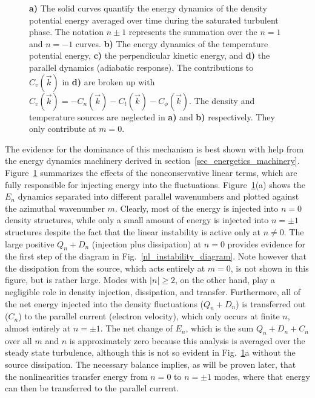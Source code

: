 \documentclass[showpacs,preprintnumbers,amsmath,amssymb,superscriptaddress]{revtex4}
\begin{document}
\begin{figure}
\hfil
\caption{\textbf{a)} The solid curves quantify the energy dynamics of the density potential energy averaged over time during the saturated turbulent phase. The notation $n \pm 1$ represents the
summation over the $n=1$ and $n=-1$ curves. \textbf{b)} The energy dynamics of the temperature potential energy, \textbf{c)} the perpendicular kinetic energy, and \textbf{d)} the parallel
dynamics (adiabatic response). The contributions to $C_v(\vec{k})$ in \textbf{d)} are broken up with $C_v(\vec{k}) = -C_n(\vec{k}) - C_t(\vec{k}) - C_\phi(\vec{k})$. 
The density and temperature sources are neglected in \textbf{a)} and \textbf{b)} respectively. They only contribute at $m=0$.}
\label{nc_dynamics_figures}
\end{figure}


The evidence for the dominance of this mechanism is best shown with
help from the energy dynamics machinery derived in section~\ref{sec_energetics_machinery}. Figure~\ref{nc_dynamics_figures} summarizes the effects of the nonconservative linear terms, which are
fully responsible for injecting energy into the fluctuations. Figure~\ref{nc_dynamics_figures}(a) shows the $E_n$ dynamics separated into different parallel wavenumbers and plotted
against the azimuthal wavenumber $m$. Clearly, most of the energy is injected into $n=0$ density structures, while only a small amount of energy is injected into
$n= \pm 1$ structures despite the fact that the linear instability is active only at $n \ne 0$. The large positive $Q_n + D_n$ (injection plus dissipation) at $n=0$ provides evidence for the first
step of the diagram in Fig.~\ref{nl_instability_diagram}. Note however that the dissipation from the source, which acts entirely at $m=0$, is not shown in this figure, but is rather large.
Modes with $|n| \ge 2$, on the other hand, play a negligible role in density injection, dissipation, and transfer. 
Furthermore, all of the net energy injected into the density fluctuations ($Q_n + D_n$) is transferred out ($C_n$) to
the parallel current (electron velocity), which only occurs at finite $n$, almost entirely at $n = \pm 1$. The net change of $E_n$, which is the sum $Q_n + D_n + C_n$ over all $m$ and $n$
is approximately zero because this analysis is averaged over the steady state turbulence, although this is not so evident in Fig.~\ref{nc_dynamics_figures}a without the source dissipation. 
The necessary balance implies, as will be proven later, that the nonlinearities transfer energy from $n=0$ to $n = \pm 1$ modes, where that energy can then
be transferred to the parallel current.
\end{document}
